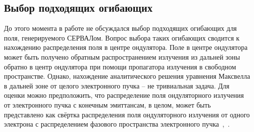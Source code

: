 \subsection{Выбор подходящих огибающих}
До этого момента в работе не обсуждался выбор подходящих огибающих для поля, генерируемого СЕРВАЛом. Вопрос выбора таких огибающих сводится к нахождению распределения поля в центре ондулятора. Поле в центре ондулятора может быть получено обратным распространением излучения из дальней зоны обратно в центр ондулятора при помощи пропагатора излучения в свободном пространстве. Однако, нахождение аналитического решения уравнения Максвелла в дальней зоне от целого электронного пучка -- не тривиальная задача.  Для оценки можно предположить, что распределение поля ондуляторного излучения от электронного пучка с конечным эмиттансам, в целом, может быть представлено как свёртка распределения поля ондуляторного излучения от одного электрона с распределением фазового пространства электронного пучка~\cite{geloni_transverse_2008},~\cite{chubar_simulation_2006}.

